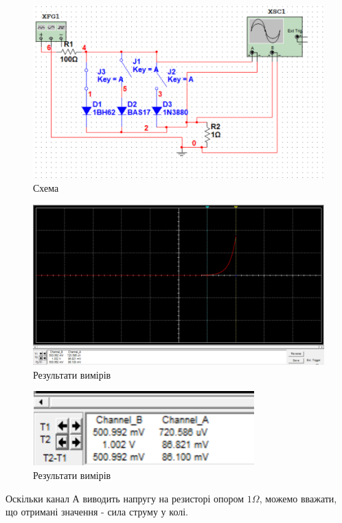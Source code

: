 \begin{figure}[ht]

\centering

\includegraphics[width=0.6\linewidth]{Діод1Схема.png}

\caption{Схема}

\label{Diod1Shema}

\end{figure}

\begin{figure}[ht]

\centering

\includegraphics[width=0.75\linewidth]{Діод1Осцилограф.png}

\caption{Результати вимірів}

\label{Diod1Osc}

\end{figure}

\begin{figure}[ht]

\centering

\includegraphics[width=0.3\linewidth]{Діод1Рез.png}

\caption{Результати вимірів}

\label{Diod1Rez}

\end{figure}

Оскільки канал А виводить напругу на резисторі опором $1  \Omega $, можемо вважати, що отримані значення - сила струму у колі.
